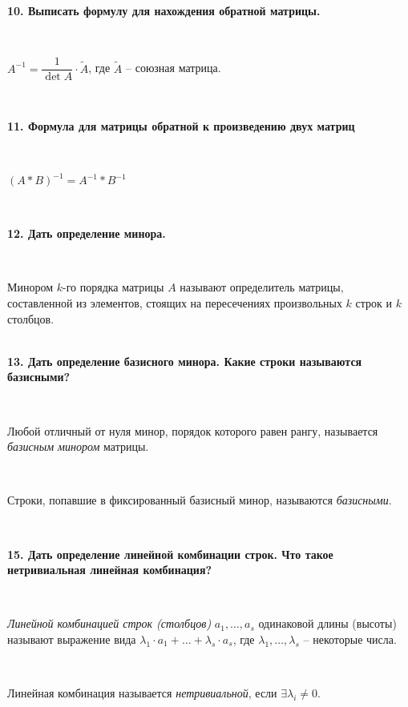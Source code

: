 \documentclass{article}
\begin{document}
    \textbf{10. Выписать формулу для нахождения обратной матрицы.}

    {
        $\;$
        \setlength{\parindent}{0.4cm}
        \hangindent=0.4cm

        $A^{-1}=\dfrac{1}{\det A}\cdot \tilde A$, где $\tilde A$ -- союзная матрица.

        $\;$
        \setlength{\parindent}{0cm}
        \hangindent=0cm
    }

    \textbf{11. Формула для матрицы обратной к произведению двух матриц}

    {
        $\;$
        \setlength{\parindent}{0.4cm}
        \hangindent=0.4cm

        $(A*B)^{-1} = A^{-1} * B^{-1}$

        $\;$
        \setlength{\parindent}{0cm}
        \hangindent=0cm
    }

    \textbf{12. Дать определение минора.}

    {
        $\;$
        \setlength{\parindent}{0.4cm}
        \hangindent=0.4cm

    Минором $k$-го порядка матрицы $A$ называют определитель матрицы, составленной из элементов, стоящих на пересечениях произвольных $k$ строк и $k$ столбцов.\\

        $\;$
        \setlength{\parindent}{0cm}
        \hangindent=0cm
    }

    \textbf{13. Дать определение базисного минора. Какие строки называются базисными?}

    {
        $\;$
        \setlength{\parindent}{0.4cm}
        \hangindent=0.4cm

    Любой отличный от нуля минор, порядок которого равен рангу, называется \textit{базисным минором} матрицы.

        $\;$

        Строки, попавшие в фиксированный базисный минор, называются \textit{базисными}.

        $\;$
        \setlength{\parindent}{0cm}
        \hangindent=0cm
    }

    \textbf{15. Дать определение линейной комбинации строк. Что такое нетривиальная линейная комбинация?}

    {
        $\;$
        \setlength{\parindent}{0.4cm}
        \hangindent=0.4cm

    \textit{Линейной комбинацией строк (столбцов)} $a_1, \ldots, a_s$ одинаковой длины (высоты) называют выражение вида $\lambda_1\cdot a_1+\ldots+\lambda_s\cdot a_s$, где $\lambda_1, \ldots, \lambda_s$ -- некоторые числа.

        $\;$

        Линейная комбинация называется \textit{нетривиальной}, если $\exists \lambda_i\ne 0$.

        $\;$
        \setlength{\parindent}{0cm}
        \hangindent=0cm
    }
\end{document}
